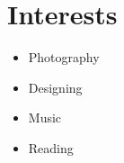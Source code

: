 \documentclass[a4paper,11pt]{article}
\makeatletter
\newcommand{\resumePOR}[3]{
\vspace{0.5mm}\item
    \begin{tabular*}{0.97\textwidth}[t]{l@{\extracolsep{\fill}}r}
        \textbf{#1}\hspace{0.3mm}#2 & \textit{\small{#3}} 
    \end{tabular*}
    \vspace{-2mm}
}
\renewcommand{\labelitemi}{} %
\newcommand{\resumeItemListStart}{\begin{justify}\begin{itemize}[leftmargin=3ex, rightmargin=2ex, noitemsep,labelsep=1.2mm,itemsep=0mm]\small}
\newcommand{\resumeSubHeadingListEnd}{\end{itemize}\vspace{2mm}}
\newcommand{\resumeItemListEnd}{\end{itemize}\end{justify}\vspace{-2mm}}
\makeatother
\begin{document}

\renewcommand{\labelitemi}{$\vcenter{\hbox{\tiny$\bullet$}}$} %

\section{\textbf{Interests}}

\resumeItemListStart
\vspace{2mm}
\item {Photography}
\item {Designing}
\item {Music}
\item {Reading}
\resumeItemListEnd
\vspace{-12pt}
\end{document}
